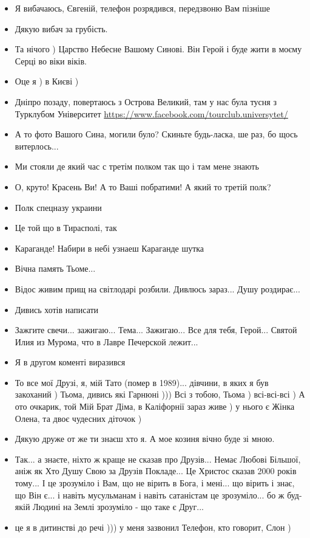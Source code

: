 \begin{itemize}
\item Я вибачаюсь, Євгеній, телефон розрядився, передзвоню Вам пізніше
\item Дякую вибач за грубість.
\item Та нічого ) Царство Небесне Вашому Синові. Він Герой і буде жити в моєму Серці во віки віків.
\item Оце я ) в Києві )
\item Дніпро позаду, повертаюсь з Острова Великий, там у нас була тусня з Турклубом Університет 
				\url{https://www.facebook.com/tourclub.universytet/}
\item А то фото Вашого Сина, могили було? Скиньте будь-ласка, ше раз, бо щось витерлось...
\item Ми стояли де який час с третім полком  так що і там мене знають
\item О, круто! Красень Ви! А то Ваші побратими! А який то третій полк?
\item Полк спецназу украини
\item Це той що в Тирасполі, так
\item Караганде! Набири в небі узнаеш Караганде шутка
\item Вічна память Тьоме...
\item Відос живим прищ на світлодарі розбили.  Дивлюсь зараз... Душу
				роздирає...
\item Дивись хотів написати
\item Зажгите свечи... зажигаю... Тема... Зажигаю... Все для тебя, Герой...
				Святой Илия из Мурома, что в Лавре Печерской лежит...
\item Я в другом коменті виразився
\item То все мої Друзі, я, мій Тато (помер в 1989)... дівчини, в яких я був
				закоханий ) Тьома, дивись які Гарнюні ))) Всі з тобою, Тьома )
								всі-всі-всі ) А ото очкарик, той Мій Брат Діма, в Каліфорнії
								зараз живе ) у нього є Жінка Олена, та двоє чудесних діточок )
\item Дякую друже от же ти знаєш хто я.  А мое козиня вічно буде зі мною.
\item Так... а знаєте, ніхто ж краще не сказав про Друзів... Немає Любові
				Більшої, аніж як Хто Душу Свою за Друзів Покладе... Це Христос сказав
								2000 років тому... І це зрозуміло і Вам, що не вірить в Бога, і
								мені... що вірить і знає, що Він є... і навіть мусульманам і
								навіть сатаністам це зрозуміло... бо ж буд-якій Людині на Землі
								зрозуміло - що таке є Друг...
\item це я в дитинстві до речі ))) у меня зазвонил Телефон, кто говорит, Слон  )

\end{itemize}
